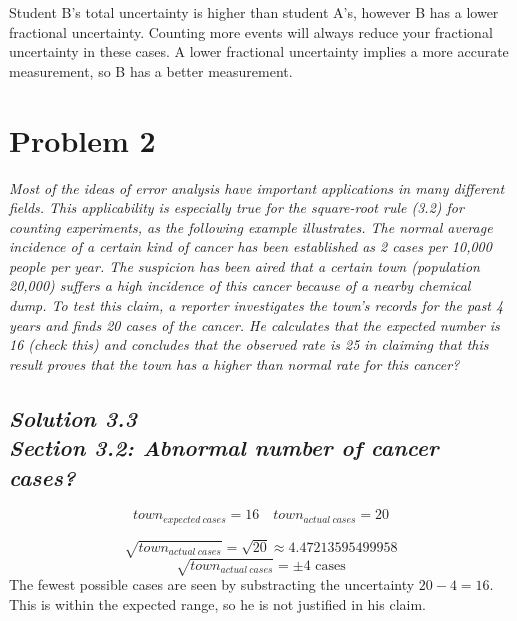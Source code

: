 \documentclass[a4paper, 12pt]{article}
\numberwithin{equation}{section}
\begin{document}
Student B's total uncertainty is higher than student A's, however B has a lower fractional uncertainty.
Counting more events will always reduce your fractional uncertainty in these cases.
A lower fractional uncertainty implies a more accurate measurement, so B has a better measurement.

\noindent\makebox[\linewidth]{\rule{\linewidth}{1pt}}

\section{Problem 2}
\emph{Most of the ideas of error analysis have important applications in many
different fields. This applicability is especially true for the square-root rule (3.2)
for counting experiments, as the following example illustrates. The normal average
incidence of a certain kind of cancer has been established as 2 cases per 10,000
people per year. The suspicion has been aired that a certain town (population
20,000) suffers a high incidence of this cancer because of a nearby chemical dump.
To test this claim, a reporter investigates the town's records for the past 4 years and
finds 20 cases of the cancer. He calculates that the expected number is 16 (check
this) and concludes that the observed rate is 25%
in claiming that this result proves that the town has a higher than normal rate for
this cancer?}\\

\subsection*{\emph{Solution 3.3\\Section 3.2: Abnormal number of cancer cases?}}

\begin{equation}
  town_{expected\:cases}= 16 \quad town_{actual\:cases} = 20
\end{equation}


\begin{equation}
\sqrt{town_{actual\:cases} } = \sqrt{20} \approx{4.47213595499958}
\end{equation}
\begin{equation}
\sqrt{town_{actual\:cases} } = \pm{4} \text{ cases}
\end{equation}
The fewest possible cases are seen by substracting the uncertainty $20 - 4 = 16$.
This is within the expected range, so he is not justified in his claim.
\end{document}

